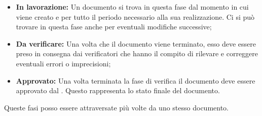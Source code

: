\begin{itemize}
\item \textbf{In lavorazione:} Un documento si trova in questa fase dal momento in cui viene creato e per tutto il periodo necessario alla sua realizzazione. Ci si può trovare in questa fase anche per eventuali modifiche successive;
\item \textbf{Da verificare:} Una volta che il documento viene terminato, esso deve essere preso in consegna dai verificatori che hanno il compito di rilevare e correggere eventuali errori o imprecisioni;
\item \textbf{Approvato:} Una volta terminata la fase di verifica il documento deve essere approvato dal \ruoloResponsabile. Questo rappresenta lo stato finale del documento. 
\end{itemize}
Queste fasi posso essere attraversate più volte da uno stesso documento.



